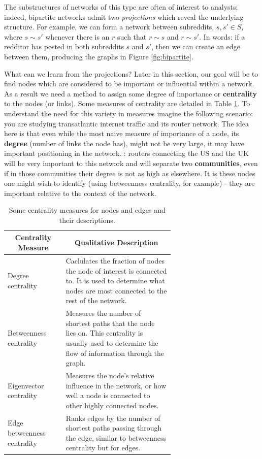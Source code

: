 \documentclass[twoside]{report}
\begin{document}
\begin{spacing}{1}
The substructures of networks of this type are often of interest to analysts; indeed, bipartite networks admit two \textit{projections} which reveal the underlying structure. For example, we can form a network between subreddits, $s, s' \in S$, where $s \sim s'$ whenever there is an $r$ such that $r \sim s$ and $r\sim s'$. In words: if a redditor has posted in both subreddits $s$ and $s'$, then we can create an edge between them, producing the graphs in Figure \ref{fig:bipartite}.

What can we learn from the projections? Later in this section, our goal will be to find nodes which are considered to be important or influential within a network. As a result we need a method to assign some degree of importance or \textbf{centrality} to the nodes (or links). Some measures of centrality are detailed in Table \ref{table:centralityMeasures}. To understand the need for this variety in measures imagine the following scenario: you are studying transatlantic internet traffic and its router network. The idea here is that even while the most naive measure of importance of a node, its \textbf{degree} (number of links the node has), might not be very large, it may have important positioning in the network. : routers connecting the US and the UK will be very important to this network and will separate two \textbf{communities}, even if in those communities their degree is not as high as elsewhere. It is these nodes one might wish to identify (using betweenness centrality, for example) - they are important relative to the context of the network.


\begin{table}[h]
\small
\centering
\begin{tabular}{|l|p{0.65\linewidth}|}
\hline
\multicolumn{1}{|c|}{\textbf{Centrality Measure}} & \multicolumn{1}{c|}{\textbf{Qualitative Description}}
\tabularnewline \hline
      Degree centrality & Caclulates the fraction of nodes the node of interest is connected to. It is used to determine what nodes are most connected to the rest of the network. \\
      \hline
      Betweenness  centrality & Measures the number of shortest paths that the node lies on. This centrality is usually used to determine the flow of information through the graph.\\
      \hline 
      Eigenvector centrality & Measures the node’s relative influence in the network, or how well a node is connected to other highly connected nodes. \\
      \hline 
      Edge betweenness centrality & Ranks edges by the number of shortest paths passing through the edge, similar to betweenness centrality but for edges.
 \tabularnewline \hline
\end{tabular}
\caption{Some centrality measures for nodes and edges and their descriptions.}
\label{table:centralityMeasures}   
\vspace{-4mm}
\end{table}


\end{spacing}
\end{document}
